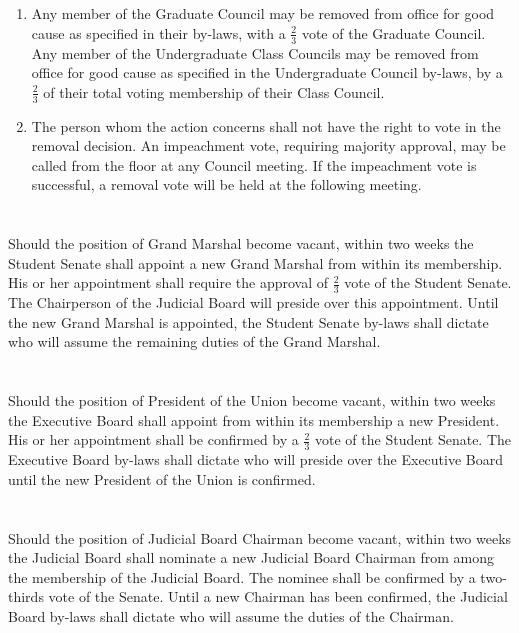 \documentclass[12pt]{constitution}
\begin{document}
\section{}
\begin{enumerate}
\item Any member of the Graduate Council may be removed from office for good cause as specified in
their by-laws, with a $\frac{2}{3}$ vote of the Graduate Council. Any member of the Undergraduate Class
Councils may be removed from office for good cause as specified in the Undergraduate Council
by-laws, by a $\frac{2}{3}$ of their total voting membership of their Class Council.
\item The person whom the action concerns shall not have the right to vote in the removal decision.
An impeachment vote, requiring majority approval, may be called from the floor at any Council
meeting. If the impeachment vote is successful, a removal vote will be held at the following
meeting. 
\end{enumerate}


\section{}
Should the position of Grand Marshal become vacant, within two weeks the Student Senate shall
appoint a new Grand Marshal from within its membership. His or her appointment shall require the
approval of $\frac{2}{3}$ vote of the Student Senate. The Chairperson of the Judicial Board will preside over this
appointment. Until the new Grand Marshal is appointed, the Student Senate by-laws shall dictate who
will assume the remaining duties of the Grand Marshal.

\section{}
Should the position of President of the Union become vacant, within two weeks the Executive Board
shall appoint from within its membership a new President. His or her appointment shall be confirmed
by a $\frac{2}{3}$ vote of the Student Senate. The Executive Board by-laws shall dictate who will preside over the
Executive Board until the new President of the Union is confirmed.

\section{}
Should the position of Judicial Board Chairman become vacant, within two weeks the Judicial Board shall
nominate a new Judicial Board Chairman from among the membership of the Judicial Board. The
nominee shall be confirmed by a two-thirds vote of the Senate. Until a new Chairman has been
confirmed, the Judicial Board by-laws shall dictate who will assume the duties of the Chairman.
\end{document}
